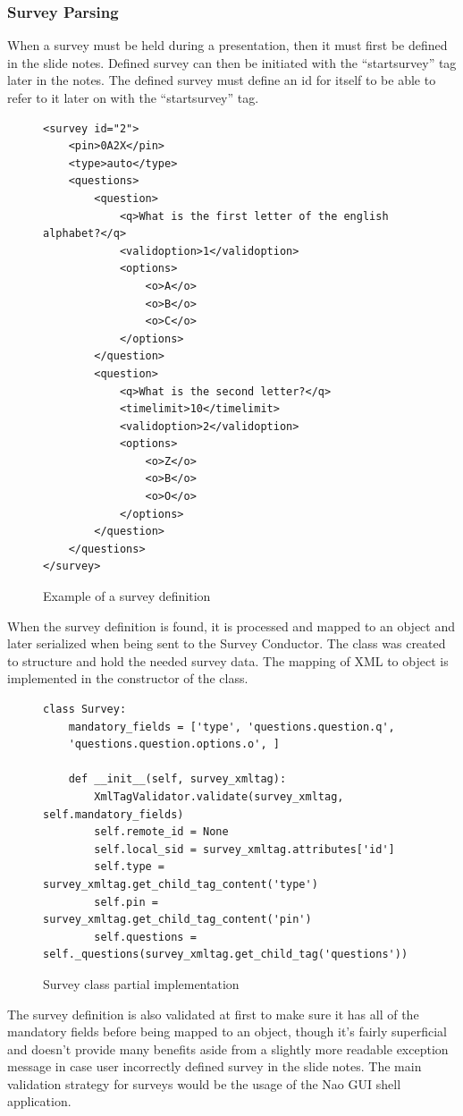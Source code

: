 \documentclass[12pt, fleqn, a4paper]{article}
\begin{document}
\subsubsection{Survey Parsing}
When a survey must be held during a presentation, then it must first be defined in the slide notes. Defined survey can then be initiated with the \enquote{startsurvey} tag later in the notes. The defined survey must define an id for itself to be able to refer to it later on with the \enquote{startsurvey} tag.
\begin{figure}[H]
	\centering
	\begin{verbatim} 
<survey id="2">
	<pin>0A2X</pin>
	<type>auto</type>
	<questions>
		<question>
			<q>What is the first letter of the english alphabet?</q>
			<validoption>1</validoption>
			<options>
				<o>A</o>
				<o>B</o>
				<o>C</o>
			</options>
		</question>
		<question>
			<q>What is the second letter?</q>
			<timelimit>10</timelimit>
			<validoption>2</validoption>
			<options>
				<o>Z</o>
				<o>B</o>
				<o>O</o>
			</options>
		</question>
	</questions>
</survey>
	\end{verbatim}
	\caption{Example of a survey definition}
\end{figure}
When the survey definition is found, it is processed and mapped to an object and later serialized when being sent to the Survey Conductor. The class  was created to structure and hold the needed survey data. The mapping of XML to object is implemented in the constructor of the class.
\begin{figure}[H]
	\centering
	\begin{verbatim} 
class Survey:
    mandatory_fields = ['type', 'questions.question.q',
	'questions.question.options.o', ]

    def __init__(self, survey_xmltag):
        XmlTagValidator.validate(survey_xmltag, self.mandatory_fields)
        self.remote_id = None
        self.local_sid = survey_xmltag.attributes['id']
        self.type = survey_xmltag.get_child_tag_content('type')
        self.pin = survey_xmltag.get_child_tag_content('pin')
        self.questions = self._questions(survey_xmltag.get_child_tag('questions'))

	\end{verbatim}
	\caption{Survey class partial implementation}
\end{figure}
The survey definition is also validated at first to make sure it has all of the mandatory fields before being mapped to an object, though it's fairly superficial and doesn't provide many benefits aside from a slightly more readable exception message in case user incorrectly defined survey in the slide notes. The main validation strategy for surveys would be the usage of the Nao GUI shell application.
\end{document}
